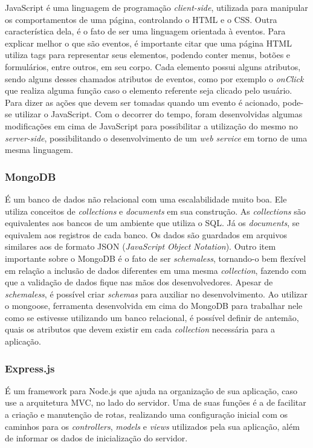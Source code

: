 \documentclass[
	12pt,				%
	oneside,			%
	a4paper,			%
	brazil				%
]{abntex2}
\begin{document}
JavaScript é uma linguagem de programação \textit{client-side}, utilizada para manipular os comportamentos de uma página, controlando o HTML e o CSS. Outra característica dela, é o fato de ser uma linguagem orientada à eventos.
Para explicar melhor o que são eventos, é importante citar que uma página HTML utiliza tags para representar seus elementos, podendo conter menus, botões e formulários, entre outros, em seu corpo. Cada elemento possui alguns atributos, sendo alguns desses chamados atributos de eventos, como por exemplo o \textit{onClick} que realiza alguma função caso o elemento referente seja clicado pelo usuário.
Para dizer as ações que devem ser tomadas quando um evento é acionado, pode-se utilizar o JavaScript. Com o decorrer do tempo, foram desenvolvidas algumas modificações em cima de JavaScript para possibilitar a utilização do mesmo no \textit{server-side}, possibilitando o desenvolvimento de um \textit{web service} em torno de uma mesma linguagem. \\

\subsubsection{MongoDB}

É um banco de dados não relacional com uma escalabilidade muito boa. Ele utiliza conceitos de \textit{collections} e \textit{documents} em sua construção. 
As \textit{collections} são equivalentes aos bancos de um ambiente que utiliza o SQL. Já os \textit{documents}, se equivalem aos registros de cada banco.
Os dados são guardados em arquivos similares aos de formato JSON (\textit{JavaScript Object Notation}).
Outro item importante sobre o MongoDB é o fato de ser \textit{schemaless}, tornando-o bem flexível em relação a inclusão de dados diferentes em uma mesma \textit{collection}, fazendo com que a validação de dados fique nas mãos dos desenvolvedores.
Apesar de \textit{schemaless}, é possível criar \textit{schemas} para auxiliar no desenvolvimento. Ao utilizar o mongoose, ferramenta desenvolvida em cima do MongoDB para trabalhar nele como se estivesse utilizando um banco relacional, é possível definir de antemão, quais os atributos que devem existir em cada \textit{collection} necessária para a aplicação.


\subsubsection{Express.js}

É um framework para Node.js que ajuda na organização de sua aplicação, caso use a arquitetura MVC, no lado do servidor. Uma de suas funções é a de facilitar a criação e manutenção de rotas, realizando uma configuração inicial com os caminhos para os \textit{controllers}, \textit{models} e \textit{views} utilizados pela sua aplicação, além de informar os dados de inicialização do servidor.
\end{document}
